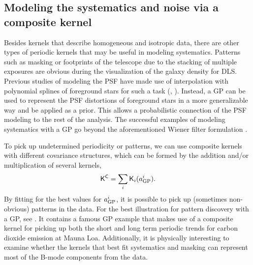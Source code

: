  

\subsection{Modeling the systematics and noise via a composite kernel}
Besides kernels that describe homogeneous and isotropic data,
there are other types of periodic kernels that may be useful
in modeling systematics. 
Patterns such as masking or footprints of the telescope due to the
stacking of multiple exposures are obvious during the visualization of the
galaxy density for DLS. 
Previous studies of modeling the PSF
have made use of interpolation with polynomial splines of foreground stars 
for such a task (\citealt{Rowe2010},
\citealt{Jee2013a}).  Instead, a GP can be used to represent the PSF distortions
of foreground stars in a more generalizable way \citep{Berge2012} and be
applied as a prior. This allows a probabilistic connection of the 
PSF modeling to the rest of the
analysis. The successful examples of modeling systematics with a GP go beyond 
the aforementioned Wiener filter formulation \citep{Perez-Cruz2013}.

To pick up undetermined periodicity or patterns, 
we can use composite kernels with different covariance structures, 
which can be formed by the addition and/or multiplication of several kernels,
\begin{equation}
	\mathsf{K}^{\mathsf{C}} = \sum_i \mathsf{K}_i(a_{\rm GP}^i).
\end{equation}
By fitting for the best values for $a_{\rm GP}^i$, it is possible  
to pick up (sometimes non-obvious) patterns in the data. 
For the best illustration for pattern discovery with a GP, see
\cite{Duvenaud2013}.
It contains a famous GP example that makes use of a composite kernel for picking up both the 
short and long term periodic trends for carbon dioxide emission at Mauna Loa.
Additionally, it is physically interesting to examine whether the kernels that best 
fit systematics and masking can represent most of the B-mode components
from the data. 

